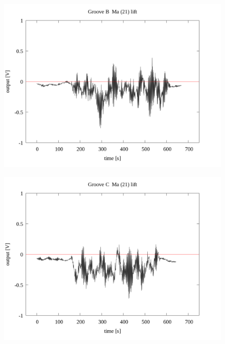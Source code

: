 \documentclass[a4paper]{jsarticle}
\begin{document}
\begin{figure}[htbp]
    \footnotesize
    \begin{center}
        \includegraphics[width=140mm]{../../../33_result/210806/moving_average/21/lift/Groove_B_ma(21)_lift.png}
    \end{center}
\end{figure}

\begin{figure}[htbp]
    \footnotesize
    \begin{center}
        \includegraphics[width=140mm]{../../../33_result/210806/moving_average/21/lift/Groove_C_ma(21)_lift.png}
    \end{center}
\end{figure}
\end{document}
